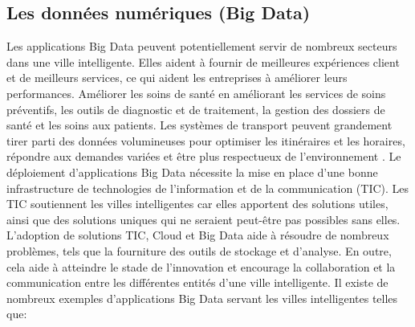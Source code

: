 \documentclass[french, a4paper, 12pt]{report}
\begin{document}
\subsection{Les données numériques (Big Data) }
Les applications Big Data peuvent potentiellement servir de nombreux secteurs dans une ville intelligente. Elles aident à fournir de meilleures expériences client et de meilleurs services, ce qui aident les entreprises à améliorer leurs performances. Améliorer les soins de santé en améliorant les services de soins préventifs, les outils de diagnostic et de traitement, la gestion des dossiers de santé et les soins aux patients. Les systèmes de transport peuvent grandement tirer parti des données volumineuses pour optimiser les itinéraires et les horaires, répondre aux demandes variées et être plus respectueux de l'environnement \cite{5}.
Le déploiement d’applications Big Data nécessite la mise en place d’une bonne infrastructure de technologies de l’information et de la communication (TIC). Les TIC soutiennent les villes intelligentes car elles apportent des solutions utiles, ainsi que des solutions uniques qui ne seraient peut-être pas possibles sans elles.
L’adoption de solutions TIC, Cloud et Big Data aide à résoudre de nombreux problèmes, tels que la fourniture des outils de stockage et d’analyse. En outre, cela aide à atteindre le stade de l'innovation et encourage la collaboration et la communication entre les différentes entités d'une ville intelligente.
Il existe de nombreux exemples d'applications Big Data servant les villes intelligentes telles que:
\end{document}
